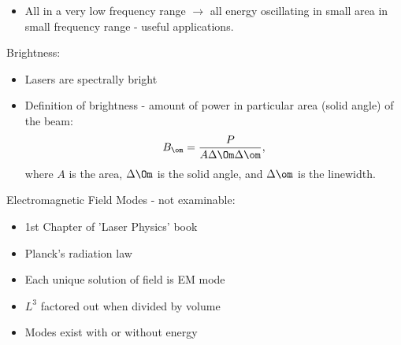 \documentclass[a4paper, 11pt, normalem]{report}
\begin{document}
\begin{figure}[H]
    \centering
\end{figure}
\begin{itemize}
    \item All in a very low frequency range $\to$ all energy oscillating in small area in small frequency range - useful applications.
\end{itemize}
Brightness:
\begin{itemize}
    \item Lasers are spectrally bright
    \item Definition of brightness - amount of power in particular area (solid angle) of the beam:
        \begin{equation}
            B_\om = \frac{P}{A\Delta\Om\Delta\om},
        \end{equation}
        where $A$ is the area, $\Delta\Om$ is the solid angle, and $\Delta\om$ is the linewidth.
\end{itemize}
Electromagnetic Field Modes - not examinable:
\begin{itemize}
    \item 1st Chapter of 'Laser Physics' book
    \item Planck's radiation law
    \item Each unique solution of field is EM mode
    \item $L^3$ factored out when divided by volume
    \item Modes exist with or without energy
\end{itemize}
\end{document}
